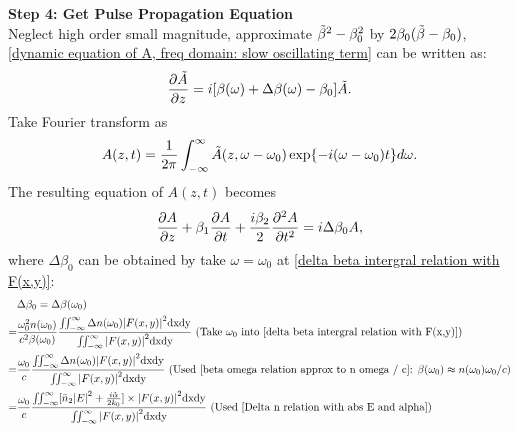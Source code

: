 \documentclass[12pt]{extarticle}
\numberwithin{equation}{section}
\numberwithin{figure}{section}
\numberwithin{table}{section}
\newcommand{\<}{\langle}
\renewcommand{\>}{\rangle}
\theoremstyle{definition}
\newcommand{\SubItem}[1]{
    {\setlength\itemindent{15pt} \item[-] #1}
}
\begin{document}
\begin{itemize}
            \SubItem{\textbf{Step 4: Get Pulse Propagation Equation}\\
            Neglect high order small magnitude, approximate $\Tilde{\beta}^2-\beta_0^2$ by $2\beta_0(\Tilde{\beta}-\beta_0)$, \autoref{dynamic equation of A, freq domain: slow oscillating term} can be written as:
            \begin{equation}
                \pdv{\Tilde{A}}{z}=i[\beta(\omega)+\Delta \beta(\omega)-\beta_0]\Tilde{A}.
            \end{equation}
            Take Fourier transform as
            \begin{equation}
                A(z,t)=\frac{1}{2\pi}\int_{-\infty}^\infty\Tilde{A}(z,\omega-\omega_0)\exp{-i(\omega-\omega_0)t}d\omega.
                \label{Fourier transform from tilde A to A}
            \end{equation}
            The resulting equation of $A(z,t)$ becomes
            \begin{equation}
                \pdv{A}{z}+\beta_1\pdv{A}{t}+\frac{i\beta_2}{2}\pdv[2]{A}{t}=i\Delta \beta_0 A,
                \label{dynamic equation of A, time domain, alpha not explicit yet: slow oscillating term}
            \end{equation}
            where $\Delta \beta_0$ can be obtained by take $\omega=\omega_0$ at \autoref{delta beta intergral relation with F(x,y)}:
                \begin{equation}
                \begin{split}
                    &\Delta \beta_0 = \Delta \beta(\omega_0)\\
                    =& \frac{\omega_0^2 n(\omega_0)}{c^2 \beta(\omega_0)} \frac{\iint_{-\infty}^\infty \Delta n(\omega_0) \abs{F(x,y)}^2 \mathrm{dxdy}}{\iint_{-\infty}^\infty \abs{F(x,y)}^2 \mathrm{dxdy}} \mbox{ (Take $\omega_0$ into \autoref{delta beta intergral relation with F(x,y)})}\\
                    =&\frac{\omega_0}{c} \frac{\iint_{-\infty}^\infty \Delta n(\omega_0) \abs{F(x,y)}^2 \mathrm{dxdy}}{\iint_{-\infty}^\infty \abs{F(x,y)}^2 \mathrm{dxdy}} \mbox{ (Used \autoref{beta omega relation approx to n omega / c}: $\beta(\omega_0)\approx n(\omega_0)\omega_0/c$)}\\
                    =&\frac{\omega_0}{c} \frac{\iint_{-\infty}^\infty [\Bar{n}_2\abs{E}^2+\frac{i\Tilde{\alpha}}{2k_0}] \times \abs{F(x,y)}^2 \mathrm{dxdy}}{\iint_{-\infty}^\infty \abs{F(x,y)}^2 \mathrm{dxdy}} \mbox{ (Used \autoref{Delta n relation with abs E and alpha})}\\

\end{split}
\end{equation}}
\end{itemize}
\end{document}
